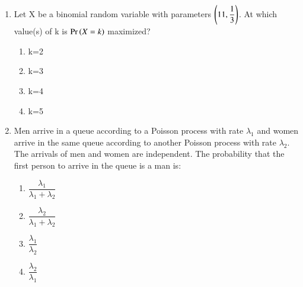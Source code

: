 \renewcommand{\theequation}{\theenumi}
\renewcommand{\thefigure}{\theenumi}
\renewcommand{\thetable}{\theenumi}
\begin{enumerate}[label=\thesection.\arabic*.,ref=\thesection.\theenumi]

\item Let X be a binomial random variable with parameters  $\left(11,\displaystyle{\frac{1}{3}}\right)$. At which value(s) of k is $\Pr\left(X = k\right)$ maximized?\\
\begin{enumerate}
\item k=2
\item k=3
\item k=4
\item k=5
\end{enumerate}
%
\solution

%
\item Men arrive in a queue according to a Poisson process with rate $\lambda_1$ and women arrive in the same queue according to another Poisson process with rate $\lambda_2$. The arrivals of men and women are independent. The probability that the first person to arrive in the queue is a man is:
\begin{enumerate}
\item $\dfrac{\lambda_1}{\lambda_1+\lambda_2}$
\item $\dfrac{\lambda_2}{\lambda_1+\lambda_2}$
\item $\dfrac{\lambda_1}{\lambda_2}$
\item $\dfrac{\lambda_2}{\lambda_1} $
    
\end{enumerate}
%
\solution


\end{enumerate}
